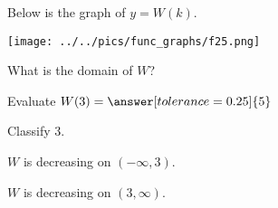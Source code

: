 \documentclass{ximera}
\author{Lee Wayand}
\begin{document}
\begin{exercise}  





Below is the graph of $y=W(k)$.  

\begin{image}
\texttt{[image: ../../pics/func\_graphs/f25.png]}
\end{image}


\begin{question} 

What is the domain of $W$?


\begin{multipleChoice}
\choice {$[-9, 2) \cup (-2, 9]$}
\choice {$[-9, 9]$}
\choice [correct]{$(-\infty, \infty)$}
\end{multipleChoice}

\end{question}





\begin{question} 


Evaluate $W(3) = \answer[tolerance=0.25]{5}$


Classify $3$. \\


\begin{multipleChoice}
\end{multipleChoice}



\end{question}










\begin{question} 


$W$ is decreasing on $(-\infty, 3)$. \\


\begin{multipleChoice}
\end{multipleChoice}




$W$ is decreasing on $(3, \infty)$. \\


\begin{multipleChoice}
\end{multipleChoice}






\end{question}
\end{exercise}
\end{document}
